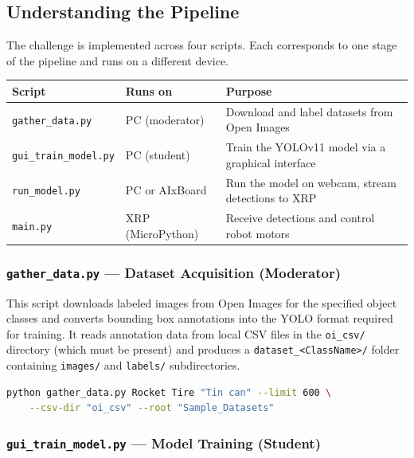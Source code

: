 \documentclass[11pt,a4paper]{article}
\begin{document}
\subsection{Understanding the Pipeline}

The challenge is implemented across four scripts. Each corresponds to one stage of the pipeline and runs on a different device.

\begin{center}
\begin{tabular}{|l|l|l|}
\hline
\textbf{Script} & \textbf{Runs on} & \textbf{Purpose} \\
\hline
\texttt{gather\_data.py}     & PC (moderator)       & Download and label datasets from Open Images \\
\texttt{gui\_train\_model.py} & PC (student)         & Train the YOLOv11 model via a graphical interface \\
\texttt{run\_model.py}       & PC or AIxBoard       & Run the model on webcam, stream detections to XRP \\
\texttt{main.py}             & XRP (MicroPython)    & Receive detections and control robot motors \\
\hline
\end{tabular}
\end{center}

\subsubsection*{\texttt{gather\_data.py} — Dataset Acquisition (Moderator)}

This script downloads labeled images from Open Images for the specified object classes and converts bounding box annotations into the YOLO format required for training. It reads annotation data from local CSV files in the \texttt{oi\_csv/} directory (which must be present) and produces a \texttt{dataset\_<ClassName>/} folder containing \texttt{images/} and \texttt{labels/} subdirectories.

\begin{lstlisting}[language=bash, caption={Gathering datasets for the three challenge classes}]
python gather_data.py Rocket Tire "Tin can" --limit 600 \
    --csv-dir "oi_csv" --root "Sample_Datasets"
\end{lstlisting}

\subsubsection*{\texttt{gui\_train\_model.py} — Model Training (Student)}
\end{document}
